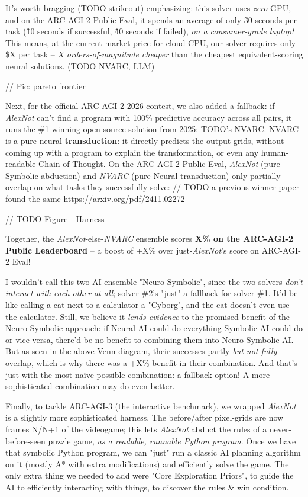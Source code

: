 \documentclass{article}
\begin{document}
It's worth bragging (TODO strikeout) emphasizing: this solver uses \textit{zero} GPU, and on the ARC-AGI-2 Public Eval, it spends an average of only \~30 seconds per task (\~10 seconds if successful, \~40 seconds if failed), \textit{on a consumer-grade laptop!} This means, at the current market price for cloud CPU, our solver requires only \$X per task -- \textit{X orders-of-magnitude cheaper} than the cheapest equivalent-scoring neural solutions. (TODO NVARC, LLM)

// Pic: pareto frontier

Next, for the official ARC-AGI-2 2026 contest, we also added a fallback: if \textit{AlexNot} can't find a program with 100\% predictive accuracy across all pairs, it runs the \#1 winning open-source solution from 2025: TODO's NVARC. NVARC is a pure-neural \textbf{transduction}: it directly predicts the output grids, without coming up with a program to explain the transformation, or even any human-readable Chain of Thought. On the ARC-AGI-2 Public Eval, \textit{AlexNot} (pure-Symbolic abduction) and \textit{NVARC} (pure-Neural transduction) only partially overlap on what tasks they successfully solve: // TODO a previous winner paper found the same https://arxiv.org/pdf/2411.02272

// TODO Figure - Harness

Together, the \textit{AlexNot}-else-\textit{NVARC} ensemble scores \textbf{X\% on the ARC-AGI-2 Public Leaderboard} -- a boost of +X\% over just-\textit{AlexNot}'s score on ARC-AGI-2 Eval!

I wouldn't call this two-AI ensemble "Neuro-Symbolic", since the two solvers \textit{don't interact with each other at all}; solver \#2's "just" a fallback for solver \#1. It'd be like calling a cat next to a calculator a "Cyborg", and the cat doesn't even use the calculator. Still, we believe it \textit{lends evidence} to the promised benefit of the Neuro-Symbolic approach: if Neural AI could do everything Symbolic AI could do or vice versa, there'd be no benefit to combining them into Neuro-Symbolic AI. But as seen in the above Venn diagram, their successes partly \textit{but not fully} overlap, which is why there was a +X\% benefit in their combination. And that's just with the most naïve possible combination: a fallback option! A more sophisticated combination may do even better.

Finally, to tackle ARC-AGI-3 (the interactive benchmark), we wrapped \textit{AlexNot} is a slightly more sophisticated harness. The before/after pixel-grids are now frames N/N+1 of the videogame; this lets \textit{AlexNot} abduct the rules of a never-before-seen puzzle game, \textit{as a readable, runnable Python program}. Once we have that symbolic Python program, we can "just" run a classic AI planning algorithm on it (mostly A* with extra modifications) and efficiently solve the game. The only extra thing we needed to add were "Core Exploration Priors", to guide the AI to efficiently interacting with things, to discover the rules \& win condition.
\end{document}
